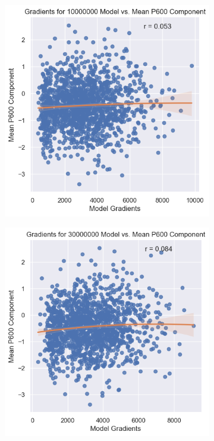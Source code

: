 \documentclass{IEEEtran}
\begin{document}
\begin{figure}[h]
    \centering
    \begin{subfigure}{0.4\textwidth}
        \centering
        \includegraphics[width=\textwidth]{gradients_vs_p600/10000000.png}
    \end{subfigure}
    \begin{subfigure}{0.4\textwidth}
        \centering
        \includegraphics[width=\textwidth]{gradients_vs_p600/30000000.png}
    \end{subfigure}
\end{figure}
\end{document}
